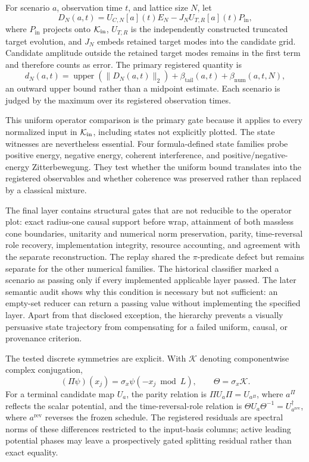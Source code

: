 For scenario $a$, observation time $t$, and lattice size $N$, let
\begin{equation}
 D_N(a,t)=U_{C,N}[a](t)E_N-J_NU_{T,R}[a](t)P_{\mathrm{in}},
 \label{eq:discrepancy}
\end{equation}
where $P_{\mathrm{in}}$ projects onto $\mathcal{K}_{\mathrm{in}}$, $U_{T,R}$ is the independently
constructed truncated target evolution, and $J_N$ embeds retained target
modes into the candidate grid.  Candidate amplitude outside the retained
target modes remains in the first term and therefore counts as error.  The
primary registered quantity is
\begin{equation}
 d_N(a,t)=\operatorname{upper}\!\left(\lVert D_N(a,t)\rVert_2\right)
          +\beta_{\mathrm{tail}}(a,t)+\beta_{\mathrm{num}}(a,t,N),
 \label{eq:certified-distance}
\end{equation}
an outward upper bound rather than a midpoint estimate.  Each scenario is
judged by the maximum over its registered observation times.

This uniform operator comparison is the primary gate because it applies to
every normalized input in $\mathcal{K}_{\mathrm{in}}$, including states not explicitly plotted.
The state witnesses are nevertheless essential.  Four formula-defined state
families probe positive energy, negative energy, coherent interference, and
positive/negative-energy Zitterbewegung.  They test whether the uniform bound
translates into the registered observables and whether coherence was preserved
rather than replaced by a classical mixture.

The final layer contains structural gates that are not reducible to the
operator plot: exact radius-one causal support before wrap, attainment of both
massless cone boundaries, unitarity and numerical norm preservation, parity,
time-reversal role recovery, implementation integrity, resource accounting,
and agreement with the separate reconstruction.  The replay shared the
$\pi$-predicate defect but remains separate for the other numerical families.
The historical classifier marked a scenario as passing only if every
implemented applicable layer passed.  The later semantic audit shows why this
condition is necessary but not sufficient: an empty-set reducer can return a
passing value without implementing the specified layer.  Apart from that
disclosed exception, the hierarchy prevents a visually persuasive state
trajectory from compensating for a failed uniform, causal, or provenance
criterion.

The tested discrete symmetries are explicit.  With $\mathcal K$ denoting
componentwise complex conjugation,
\begin{equation}
 (\Pi\psi)(x_j)=\sigma_x\psi(-x_j\bmod L),\qquad
 \Theta=\sigma_x\mathcal K.
 \label{eq:tested-symmetries}
\end{equation}
For a terminal candidate map $U_a$, the parity relation is
$\Pi U_a\Pi=U_{a^\Pi}$, where $a^\Pi$ reflects the scalar potential, and the
time-reversal-role relation is
$\Theta U_a\Theta^{-1}=U_{a^{\mathrm{rev}}}^{\dagger}$, where
$a^{\mathrm{rev}}$ reverses the frozen schedule.  The registered residuals are
spectral norms of these differences restricted to the input-basis columns;
active leading potential phases may leave a prospectively gated splitting
residual rather than exact equality.

